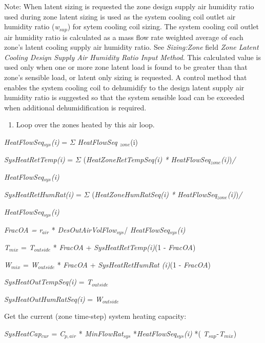 Note: When latent sizing is requested the zone design supply air humidity ratio used during zone latent sizing is used as the system cooling coil outlet air humidity ratio (\emph{w\(_{sup}\)}) for sytem cooling coil sizing. The system cooling coil outlet air humidity ratio is calculated as a mass flow rate weighted average of each zone's latent cooling supply air humidity ratio. See \emph{Sizing:Zone} field \emph{Zone Latent Cooling Design Supply Air Humidity Ratio Input Method}. This calculated value is used only when one or more zone latent load is found to be greater than that zone's sensible load, or latent only sizing is requested. A control method that enables the system cooling coil to dehumidify to the design latent supply air humidity ratio is suggested so that the system sensible load can be exceeded when additional dehumidification is required.


\begin{enumerate}
\def\labelenumi{(\arabic{enumi})}
\setcounter{enumi}{1}
\tightlist
\item
  Loop over the zones heated by this air loop.
\end{enumerate}

\emph{HeatFlowSeq\(_{sys}\)(i)} = $\Sigma$ \emph{HeatFlowSeq \(_{zone}\)}(i)

\emph{SysHeatRetTemp(i)} = $\Sigma$ (\emph{HeatZoneRetTempSeq(i) * HeatFlowSeq\(_{zone}\)(i)})\emph{/}

\emph{HeatFlowSeq\(_{sys}\)(i)}

\emph{SysHeatRetHumRat(i)} = $\Sigma$ (\emph{HeatZoneHumRatSeq(i) * HeatFlowSeq\(_{zone}\)(i)})\emph{/}

\emph{HeatFlowSeq\(_{sys}\)(i)}

\emph{FracOA = r\(_{air}\)} * \emph{DesOutAirVolFlow\(_{sys}\)}/ \emph{HeatFlowSeq\(_{sys}\)(i)}

\emph{T\(_{mix}\)} = \emph{T\(_{outside}\)} * \emph{FracOA} + \emph{SysHeatRetTemp(i)}(1 - \emph{FracOA})

\emph{W\(_{mix}\)} = \emph{W\(_{outside}\)} * \emph{FracOA} + \emph{SysHeatRetHumRat (i)}(1 - \emph{FracOA})

\emph{SysHeatOutTempSeq(i)} = \emph{T\(_{outside}\)}

\emph{SysHeatOutHumRatSeq(i)} = \emph{W\(_{outside}\)}

Get the current (zone time-step) system heating capacity:

\emph{SysHeatCap\(_{cur}\)} = \emph{C\(_{p,air}\)} * \emph{MinFlowRat\(_{sys}\)} *\emph{HeatFlowSeq\(_{sys}\)(i)} *( \emph{T\(_{sup}\)}-\emph{T\(_{mix}\)})

